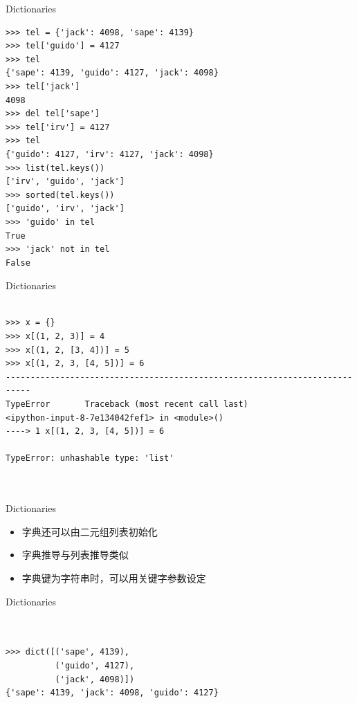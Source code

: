 \documentclass{beamer}
\begin{document}
\begin{frame}[t,fragile]{Dictionaries}


    \scriptsize
\begin{verbatim}
>>> tel = {'jack': 4098, 'sape': 4139}
>>> tel['guido'] = 4127
>>> tel
{'sape': 4139, 'guido': 4127, 'jack': 4098}
>>> tel['jack']
4098
>>> del tel['sape']
>>> tel['irv'] = 4127
>>> tel
{'guido': 4127, 'irv': 4127, 'jack': 4098}
>>> list(tel.keys())
['irv', 'guido', 'jack']
>>> sorted(tel.keys())
['guido', 'irv', 'jack']
>>> 'guido' in tel
True
>>> 'jack' not in tel
False
\end{verbatim}


\end{frame}

\begin{frame}[t,fragile]{Dictionaries}


\begin{verbatim}

>>> x = {}
>>> x[(1, 2, 3)] = 4
>>> x[(1, 2, [3, 4])] = 5
>>> x[(1, 2, 3, [4, 5])] = 6
---------------------------------------------------------------------------
TypeError       Traceback (most recent call last)
<ipython-input-8-7e134042fef1> in <module>()
----> 1 x[(1, 2, 3, [4, 5])] = 6

TypeError: unhashable type: 'list'



\end{verbatim}


\end{frame}

\begin{frame}[t]{Dictionaries}

    \begin{itemize}
        \item 字典还可以由二元组列表初始化
        \item 字典推导与列表推导类似
        \item 字典键为字符串时，可以用关键字参数设定
    \end{itemize}

\end{frame}


\begin{frame}[t,fragile]{Dictionaries}


\begin{verbatim}


>>> dict([('sape', 4139), 
          ('guido', 4127), 
          ('jack', 4098)])
{'sape': 4139, 'jack': 4098, 'guido': 4127}


\end{verbatim}


\end{frame}
\end{document}
